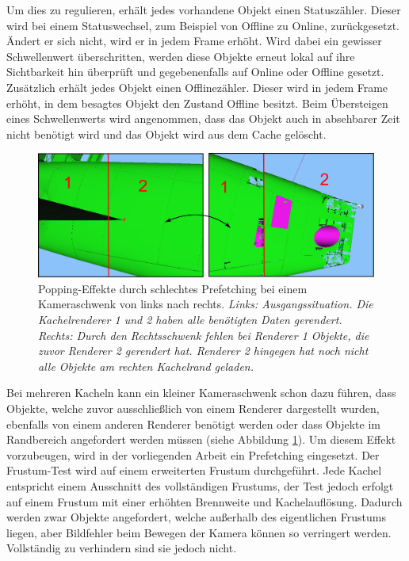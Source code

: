 Um dies zu regulieren, erhält jedes vorhandene Objekt einen Statuszähler. Dieser wird bei einem Statuswechsel, zum Beispiel von Offline zu Online, zurückgesetzt. Ändert er sich nicht, wird er in jedem Frame erhöht. Wird dabei ein gewisser Schwellenwert überschritten, werden diese Objekte erneut lokal auf ihre Sichtbarkeit hin überprüft und gegebenenfalls auf Online oder Offline gesetzt. Zusätzlich erhält jedes Objekt einen Offlinezähler. Dieser wird in jedem Frame erhöht, in dem besagtes Objekt den Zustand Offline besitzt. Beim Übersteigen eines Schwellenwerts wird angenommen, dass das Objekt auch in absehbarer Zeit nicht benötigt wird und das Objekt wird aus dem Cache gelöscht.
\begin{figure}
\centering
\includegraphics[width=\hsize]{images/prefetching.pdf}
\caption[Popping-Effekte durch schlechtes Prefetching.]{\label{fig:basics:prefetching}Popping-Effekte durch schlechtes Prefetching bei einem Kameraschwenk von links nach rechts. \textit{Links: Ausgangssituation. Die Kachelrenderer 1 und 2 haben alle benötigten Daten gerendert. Rechts: Durch den Rechtsschwenk fehlen bei Renderer 1 Objekte, die zuvor Renderer 2 gerendert hat. Renderer 2 hingegen hat noch nicht alle Objekte am rechten Kachelrand geladen.}}
\end{figure}

Bei mehreren Kacheln kann ein kleiner Kameraschwenk schon dazu führen, dass Objekte, welche zuvor ausschließlich von einem Renderer dargestellt wurden, ebenfalls von einem anderen Renderer benötigt werden oder dass Objekte im Randbereich angefordert werden müssen (siehe Abbildung \ref{fig:basics:prefetching}). Um diesem Effekt vorzubeugen, wird in der vorliegenden Arbeit ein Prefetching eingesetzt. Der Frustum-Test wird auf einem erweiterten Frustum durchgeführt. Jede Kachel entspricht einem Ausschnitt des vollständigen Frustums, der Test jedoch erfolgt auf einem Frustum mit einer erhöhten Brennweite und Kachelauflösung. Dadurch werden zwar Objekte angefordert, welche außerhalb des eigentlichen Frustums liegen, aber Bildfehler beim Bewegen der Kamera können so verringert werden. Vollständig zu verhindern sind sie jedoch nicht.


